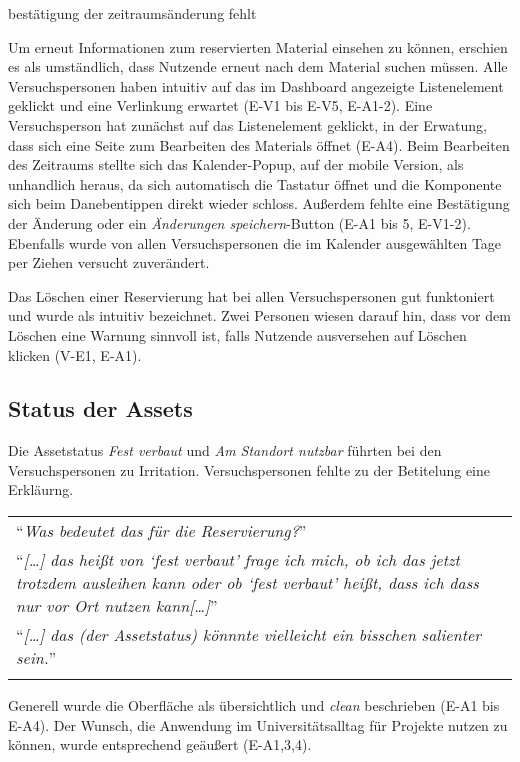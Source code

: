 bestätigung der zeitraumsänderung fehlt



Um erneut Informationen zum reservierten Material einsehen zu können, erschien es
als umständlich, dass Nutzende erneut nach dem Material suchen müssen. Alle
Versuchspersonen haben intuitiv auf das im Dashboard angezeigte Listenelement
geklickt und eine Verlinkung erwartet (E-V1 bis E-V5, E-A1-2). Eine
Versuchsperson hat zunächst auf das Listenelement geklickt, in der Erwatung,
dass sich eine Seite zum Bearbeiten des Materials öffnet (E-A4). Beim Bearbeiten
des Zeitraums stellte sich das Kalender-Popup, auf der mobile Version, als
unhandlich heraus, da sich automatisch die Tastatur öffnet und die Komponente
sich beim Danebentippen direkt wieder schloss. Außerdem fehlte eine Bestätigung
der Änderung oder ein \textit{Änderungen speichern}-Button (E-A1 bis 5, E-V1-2).
Ebenfalls wurde von allen Versuchspersonen die im Kalender ausgewählten Tage per
Ziehen versucht zuverändert.

Das Löschen einer Reservierung hat bei allen Versuchspersonen gut funktoniert
und wurde als intuitiv bezeichnet. Zwei Personen wiesen darauf hin, dass vor dem
Löschen eine Warnung sinnvoll ist, falls Nutzende ausversehen auf Löschen
klicken (V-E1, E-A1).


\subsection{Status der Assets}
Die Assetstatus \textit{Fest verbaut} und \textit{Am Standort nutzbar} führten
bei den Versuchspersonen zu Irritation. Versuchspersonen fehlte zu der Betitelung
eine Erkläurng.

\begin{longtable}{p{}} \arrayrulecolor{maincolor}\hline
  \enquote{\textit{Was bedeutet das für die Reservierung?}} \\
  \enquote{\textit{[\dots] das heißt von \enquote{fest verbaut} frage ich mich,
      ob ich das jetzt trotzdem ausleihen kann oder ob \enquote{fest verbaut} heißt,
  dass ich dass nur vor Ort nutzen kann[\dots]}}            \\
  \enquote{\textit{[\dots] das (der Assetstatus) könnnte vielleicht ein bisschen
  salienter sein.}}                                         \\
  \arrayrulecolor{maincolor}\hline
\end{longtable}

Generell wurde die Oberfläche als übersichtlich und \textit{clean} beschrieben
(E-A1 bis E-A4). Der Wunsch, die Anwendung im Universitätsalltag für Projekte
nutzen zu können, wurde entsprechend geäußert (E-A1,3,4).

